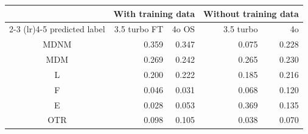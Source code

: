 \begin{table}[t]
\fontsize{12.0pt}{14.4pt}\selectfont
\begin{tabular*}{\linewidth}{@{\extracolsep{\fill}}crrrr}
\toprule
 & \multicolumn{2}{c}{With training data} & \multicolumn{2}{c}{Without training data} \\ 
\cmidrule(lr){2-3} \cmidrule(lr){4-5}
predicted label & 3.5 turbo FT & 4o OS & 3.5 turbo & 4o \\ 
\midrule\addlinespace[2.5pt]
MDNM & 0.359 & 0.347 & 0.075 & 0.228 \\ 
MDM & 0.269 & 0.242 & 0.265 & 0.230 \\ 
L & 0.200 & 0.222 & 0.185 & 0.216 \\ 
F & 0.046 & 0.031 & 0.068 & 0.120 \\ 
E & 0.028 & 0.053 & 0.369 & 0.135 \\ 
OTR & 0.098 & 0.105 & 0.038 & 0.070 \\ 
\bottomrule
\end{tabular*}
\end{table}

